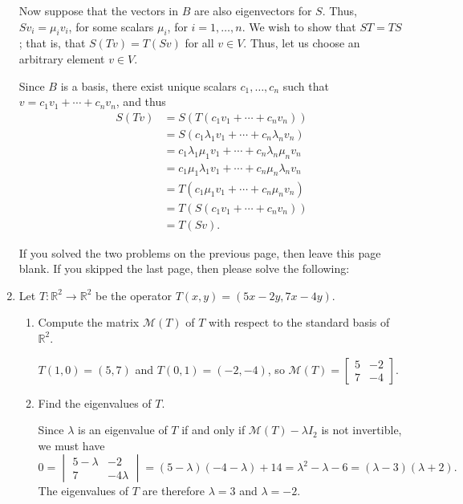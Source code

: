 \documentclass[12pt]{article}
\newcommand{\points}[1]{\marginpar{\hspace{24pt}[#1]}}
\newcommand{\R}{\mathbb{R}}
\begin{document}
\begin{enumerate}
Now suppose that the vectors in $B$ are also eigenvectors for $S$. Thus, $Sv_i = \mu_iv_i$, for some scalars $\mu_i$, for $i=1,\ldots, n$. We wish to show that $ST=TS$; that is, that $S(Tv)=T(Sv)$ for all $v\in V$. Thus, let us choose an arbitrary element $v\in V$.

Since $B$ is a basis, there exist unique scalars $c_1,\ldots, c_n$ such that $v=c_1v_1+\cdots + c_nv_n$, and thus
\begin{align*}
 S(Tv) & = S(T(c_1v_1+\cdots + c_nv_n))\\
& = S(c_1\lambda_1v_1+\cdots + c_n\lambda_nv_n)\\
& = c_1\lambda_1\mu_1v_1+\cdots + c_n\lambda_n\mu_nv_n\\
& = c_1\mu_1\lambda_1v_1+\cdots + c_n\mu_n\lambda_nv_n\\
& = T(c_1\mu_1v_1+\cdots + c_n\mu_nv_n)\\
& = T(S(c_1v_1+\cdots +c_nv_n))\\
& = T(Sv).
\end{align*}




\newpage

If you solved the two problems on the previous page, then leave this page blank. If you skipped the last page, then please solve the following:

\item Let $T:\R^2\to\R^2$ be the operator $T(x,y) = (5x-2y,7x-4y)$.
\begin{enumerate}
\item Compute the matrix $\mathcal{M}(T)$ of $T$ with respect to the standard basis of $\R^2$. \points{2}

\bigskip

$T(1,0)=(5,7)$ and $T(0,1)=(-2,-4)$, so $\mathcal{M}(T)=\begin{bmatrix}5&-2\\7&-4\end{bmatrix}$.

\bigskip

\item Find the eigenvalues of $T$. \points{4}

\bigskip

Since $\lambda$ is an eigenvalue of $T$ if and only if $\mathcal{M}(T)-\lambda I_2$ is not invertible, we must have
\[
 0 = \begin{vmatrix}5-\lambda&-2\\7&-4\lambda\end{vmatrix} = (5-\lambda)(-4-\lambda)+14 = \lambda^2-\lambda-6 = (\lambda-3)(\lambda+2).
\]
The eigenvalues of $T$ are therefore $\lambda=3$ and $\lambda = -2$.



\end{enumerate}
\end{enumerate}
\end{document}
